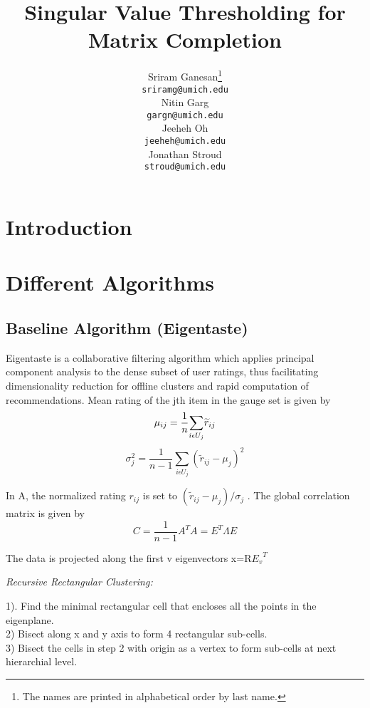 \documentclass{article} %
\title{Singular Value Thresholding for Matrix Completion}
\author{
Sriram Ganesan\thanks{ The names are printed in alphabetical order by last name.} \\
\texttt{sriramg@umich.edu} \\
\And
Nitin Garg \\
\texttt{gargn@umich.edu} \\
\AND
Jeeheh Oh \\
\texttt{jeeheh@umich.edu} \\
\And
Jonathan Stroud \\
\texttt{stroud@umich.edu} \\
}
\begin{document}
\maketitle

\begin{abstract}
%
\end{abstract}

\section{Introduction}

\section{Different Algorithms}

\subsection{Baseline Algorithm (Eigentaste)}

Eigentaste is a collaborative filtering algorithm which applies principal component analysis to the dense subset of user ratings, thus facilitating dimensionality reduction for offline clusters and rapid computation of recommendations. 
Mean rating of the jth item in the gauge set is given by
\begin{equation*}
\mu_{ij}=\frac{1}{n}{\sum_{i\epsilon U_{j}}}\widetilde{r}_{ij}\\
\end{equation*}
\begin{equation*}
\sigma_j^2=\frac{1}{n-1}{\sum_{i\epsilon U_{j}}}({\widetilde{r}_{ij}-\mu_{j}})^{2}
\end{equation*}

In A, the normalized rating $r_{ij}$ is set to $({\widetilde{r}_{ij}-\mu_{j}})/\sigma _{j}$ . The global correlation matrix is given by
\begin{equation*}
C=\frac{1}{n-1}A^{T}A=E^{T} \Lambda E
\end{equation*}

The data is projected along the first v eigenvectors x=R${E_{v}}^{T}$

\textit{Recursive Rectangular Clustering: }

1). Find the minimal rectangular cell that encloses all the points in the eigenplane. \\
2) Bisect along x and y axis to form 4 rectangular sub-cells.\\
3) Bisect the cells in step 2 with origin as a vertex to form sub-cells at next hierarchial level.
\end{document}

